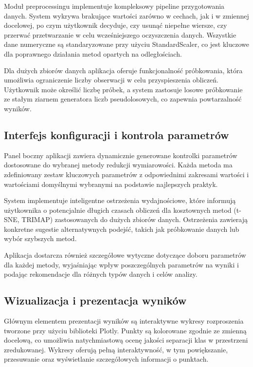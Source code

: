 \documentclass[a4paper, 12pt]{article}
\begin{document}
Moduł preprocessingu implementuje kompleksowy pipeline przygotowania danych. System wykrywa brakujące wartości zarówno w cechach, jak i w zmiennej docelowej, po czym użytkownik decyduje, czy usunąć niepełne wiersze, czy przerwać przetwarzanie w celu wcześniejszego oczyszczenia danych. Wszystkie dane numeryczne są standaryzowane przy użyciu StandardScaler, co jest kluczowe dla poprawnego działania metod opartych na odległościach.

Dla dużych zbiorów danych aplikacja oferuje funkcjonalność próbkowania, która umożliwia ograniczenie liczby obserwacji w celu przyspieszenia obliczeń. Użytkownik może określić liczbę próbek, a system zastosuje losowe próbkowanie ze stałym ziarnem generatora liczb pseudolosowych, co zapewnia powtarzalność wyników.

\subsection{Interfejs konfiguracji i kontrola parametrów}

Panel boczny aplikacji zawiera dynamicznie generowane kontrolki parametrów dostosowane do wybranej metody redukcji wymiarowości. Każda metoda ma zdefiniowany zestaw kluczowych parametrów z odpowiednimi zakresami wartości i wartościami domyślnymi wybranymi na podstawie najlepszych praktyk.

System implementuje inteligentne ostrzeżenia wydajnościowe, które informują użytkownika o potencjalnie długich czasach obliczeń dla kosztownych metod (t-SNE, TRIMAP) zastosowanych do dużych zbiorów danych. Ostrzeżenia zawierają konkretne sugestie alternatywnych podejść, takich jak próbkowanie danych lub wybór szybszych metod.

Aplikacja dostarcza również szczegółowe wytyczne dotyczące doboru parametrów dla każdej metody, wyjaśniając wpływ poszczególnych parametrów na wyniki i podając rekomendacje dla różnych typów danych i celów analizy.

\subsection{Wizualizacja i prezentacja wyników}

Głównym elementem prezentacji wyników są interaktywne wykresy rozproszenia tworzone przy użyciu biblioteki Plotly. Punkty są kolorowane zgodnie ze zmienną docelową, co umożliwia natychmiastową ocenę jakości separacji klas w przestrzeni zredukowanej. Wykresy oferują pełną interaktywność, w tym powiększanie, przesuwanie oraz wyświetlanie szczegółowych informacji o punktach.
\end{document}
